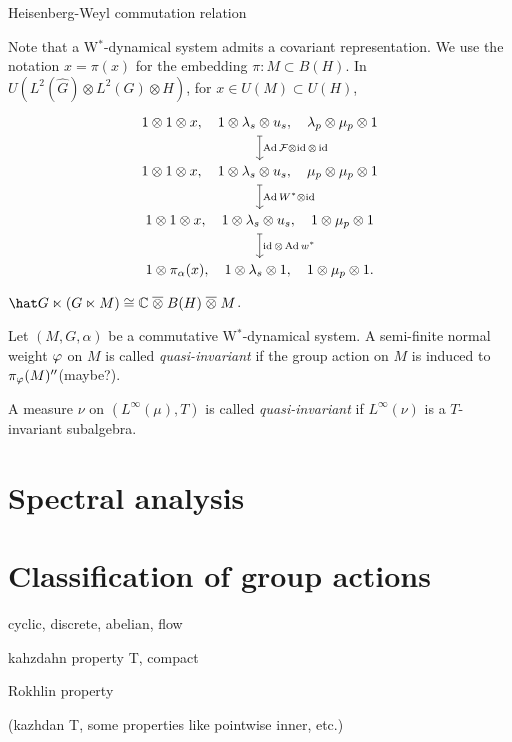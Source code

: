 \documentclass{../../large}
\begin{document}
\begin{prb}
Heisenberg-Weyl commutation relation
\end{prb}
\begin{pf}
Note that a W$^*$-dynamical system admits a covariant representation.
We use the notation $x=\pi(x)$ for the embedding $\pi:M\subset B(H)$.
In $U(L^2(\hat G)\otimes L^2(G)\otimes H)$, for $x\in U(M)\subset U(H)$,
\[\begin{tikzcd}
1\otimes1\otimes x,\quad1\otimes\lambda_s\otimes u_s,\quad\lambda_p\otimes\mu_p\otimes1 \dar[mapsto]{\Ad\cF\otimes\id\otimes\id} \\
1\otimes1\otimes x,\quad1\otimes\lambda_s\otimes u_s,\quad\mu_p\otimes\mu_p\otimes1 \dar[mapsto]{\Ad W^*\otimes\id} \\
1\otimes1\otimes x,\quad1\otimes\lambda_s\otimes u_s,\quad1\otimes\mu_p\otimes1 \dar[mapsto]{\id\otimes\Ad w^*} \\
1\otimes\pi_\alpha(x),\quad1\otimes\lambda_s\otimes1,\quad1\otimes\mu_p\otimes1.
\end{tikzcd}\]
$\hat G\ltimes(G\ltimes M)\cong\C\mathrel{\bar\otimes}B(H)\mathrel{\bar\otimes}M$.
\end{pf}




\begin{prb}
Let $(M,G,\alpha)$ be a commutative W$^*$-dynamical system.
A semi-finite normal weight $\varphi$ on $M$ is called \emph{quasi-invariant} if the group action on $M$ is induced to $\pi_\varphi(M)''$(maybe?).

A measure $\nu$ on $(L^\infty(\mu),T)$ is called \emph{quasi-invariant} if $L^\infty(\nu)$ is a $T$-invariant subalgebra.
\end{prb}

\section{Spectral analysis}






\section{Classification of group actions}

cyclic, discrete, abelian, flow

kahzdahn property T, compact

Rokhlin property

(kazhdan T, some properties like pointwise inner, etc.)
\end{document}
